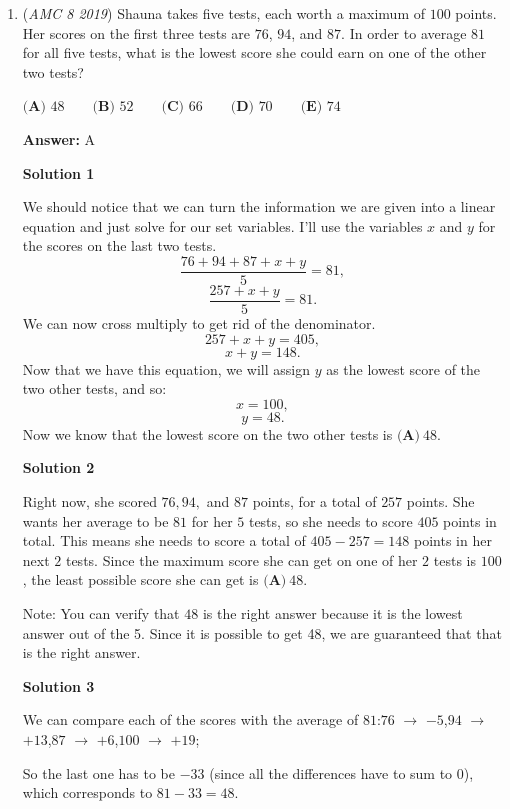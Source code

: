 \begin{enumerate}
 


	\item (\textit{AMC 8 2019}) Shauna takes five tests, each worth a maximum of $100$ points. Her scores on the first three tests are $76$, $94$, and $87$. In order to average $81$ for all five tests, what is the lowest score she could earn on one of the other two tests?


 $\textbf{(A) }48\qquad\textbf{(B) }52\qquad\textbf{(C) }66\qquad\textbf{(D) }70\qquad\textbf{(E) }74$

 \textbf{Answer: }A



\textbf{Solution 1}

We should notice that we can turn the information we are given into a linear equation and just solve for our set variables. I'll use the variables $x$ and $y$ for the scores on the last two tests. 
 \[\frac{76+94+87+x+y}{5} = 81,\] 
 \[\frac{257+x+y}{5} = 81.\] We can now cross multiply to get rid of the denominator. 
 \[257+x+y = 405,\] 
 \[x+y = 148.\] Now that we have this equation, we will assign $y$ as the lowest score of the two other tests, and so: 
 \[x = 100,\] 
 \[y=48.\] Now we know that the lowest score on the two other tests is $\boxed{\textbf{(A)}\ 48}$.

 



\textbf{Solution 2}

Right now, she scored $76, 94,$ and $87$ points, for a total of $257$ points. She wants her average to be $81$ for her $5$ tests, so she needs to score $405$ points in total. This means she needs to score a total of $405-257=  148$ points in her next $2$ tests. Since the maximum score she can get on one of her $2$ tests is $100$, the least possible score she can get is $\boxed{\textbf{(A)}\ 48}$.

 Note: You can verify that $\boxed{48}$ is the right answer because it is the lowest answer out of the 5. Since it is possible to get 48, we are guaranteed that that is the right answer.

 



\textbf{Solution 3}

We can compare each of the scores with the average of $81$:$76$ $\rightarrow$ $-5$,$94$ $\rightarrow$ $+13$,$87$ $\rightarrow$ $+6$,$100$ $\rightarrow$ $+19$;

 So the last one has to be $-33$ (since all the differences have to sum to $0$), which corresponds to $81-33 = \boxed{48}$.


\end{enumerate}
